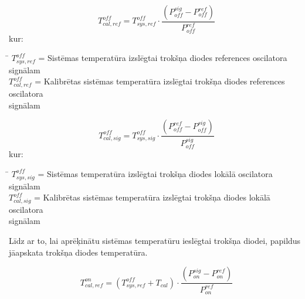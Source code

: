 \begin{equation}
T_{cal,ref}^{off} = T_{sys,ref}^{off} \cdot \frac{(P_{off}^{sig} - P_{off}^{ref})}{P_{off}^{ref}}\tag{1.2.4}\label{eq:1.2.4} 
\end{equation}
kur:
\begin{tabbing}
\phantom{\hspace{20mm}}\= \kill
$T_{sys,ref}^{off}$\>  = Sistēmas temperatūra izslēgtai trokšņa diodes references oscilatora signālam\\
$T_{cal,ref}^{off}$\>  = Kalibrētas sistēmas temperatūra izslēgtai trokšņa diodes references oscilatora \\ signālam\\
\end{tabbing}
\begin{equation}
T_{cal,sig}^{off} = T_{sys,sig}^{off} \cdot \frac{(P_{off}^{ref} - P_{off}^{sig})}{P_{off}^{sig}}\tag{1.2.5}\label{eq:1.2.5} 
\end{equation}
kur:
\begin{tabbing}
\phantom{\hspace{20mm}}\= \kill
$T_{sys,sig}^{off}$\>  = Sistēmas temperatūra izslēgtai trokšņa diodes lokālā oscilatora signālam\\
$T_{cal,sig}^{off}$\>  = Kalibrētas sistēmas temperatūra izslēgtai trokšņa diodes lokālā oscilatora \\ signālam\\
\end{tabbing}

Līdz ar to, lai aprēķinātu sistēmas temperatūru ieslēgtai trokšņa diodei, papildus jāapskata trokšņa diodes temperatūra. 

\begin{equation}
T_{cal,ref}^{on} = \left( T_{sys,ref}^{off} + T_{cal} \right) \cdot \frac{\left( P_{on}^{sig} -  P_{on}^{ref}\right)}{ P_{on}^{ref}}\tag{1.2.6}\label{eq:1.2.6}   
\end{equation}

